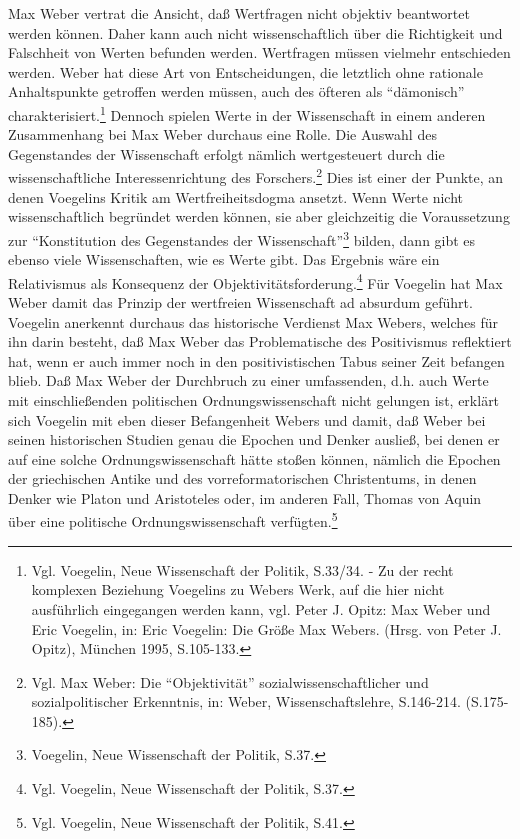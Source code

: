 Max Weber vertrat die Ansicht, daß Wertfragen nicht objektiv beantwortet
werden können. Daher kann auch nicht wissenschaftlich über die Richtigkeit und
Falschheit von Werten befunden werden. Wertfragen müssen vielmehr entschieden
werden. Weber hat diese Art von Entscheidungen, die letztlich ohne rationale
Anhaltspunkte getroffen werden müssen, auch des öfteren als "`dämonisch"'
charakterisiert.\footnote{Vgl. Voegelin, Neue Wissenschaft der Politik,
  S.33/34. - Zu der recht komplexen Beziehung Voegelins zu Webers Werk, auf
  die hier nicht ausführlich eingegangen werden kann, vgl. Peter J. Opitz: Max
  Weber und Eric Voegelin, in: Eric Voegelin: Die Größe Max Webers. (Hrsg. von
  Peter J.  Opitz), München 1995, S.105-133.} Dennoch spielen Werte in der
Wissenschaft in einem anderen Zusammenhang bei Max Weber durchaus eine Rolle.
Die Auswahl des Gegenstandes der Wissenschaft erfolgt nämlich wertgesteuert
durch die wissenschaftliche Interessenrichtung des Forschers.\footnote{Vgl.
  Max Weber: Die "`Objektivität"' sozialwissenschaftlicher und
  sozialpolitischer Erkenntnis, in: Weber, Wissenschaftslehre, S.146-214.
  (S.175-185).} Dies ist einer der Punkte, an denen Voegelins Kritik am
Wertfreiheitsdogma ansetzt.  Wenn Werte nicht wissenschaftlich begründet
werden können, sie aber gleichzeitig die Voraussetzung zur "`Konstitution des
Gegenstandes der Wissenschaft"'\footnote{Voegelin, Neue Wissenschaft der
  Politik, S.37.} bilden, dann gibt es ebenso viele Wissenschaften, wie es
Werte gibt. Das Ergebnis wäre ein Relativismus als Konsequenz der
Objektivitätsforderung.\footnote{Vgl.  Voegelin, Neue Wissenschaft der
  Politik, S.37.} Für Voegelin hat Max Weber damit das Prinzip der wertfreien
Wissenschaft ad absurdum geführt. Voegelin anerkennt durchaus das historische
Verdienst Max Webers, welches für ihn darin besteht, daß Max Weber das
Problematische des Positivismus reflektiert hat, wenn er auch immer noch in
den positivistischen Tabus seiner Zeit befangen blieb. Daß Max Weber der
Durchbruch zu einer umfassenden, d.h. auch Werte mit einschließenden
politischen Ordnungswissenschaft nicht gelungen ist, erklärt sich Voegelin mit
eben dieser Befangenheit Webers und damit, daß Weber bei seinen historischen
Studien genau die Epochen und Denker ausließ, bei denen er auf eine solche
Ordnungswissenschaft hätte stoßen können, nämlich die Epochen der griechischen
Antike und des vorreformatorischen Christentums, in denen Denker wie Platon
und Aristoteles oder, im anderen Fall, Thomas von Aquin über eine politische
Ordnungswissenschaft verfügten.\footnote{Vgl.  Voegelin, Neue Wissenschaft der
  Politik, S.41.}

